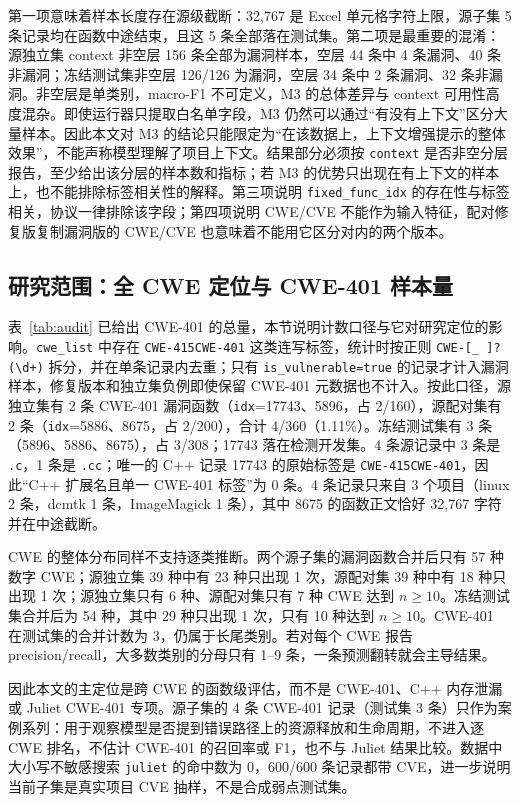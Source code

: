 \documentclass[conference]{IEEEtran}
\begin{document}
第一项意味着样本长度存在源级截断：32{,}767 是 Excel 单元格字符上限，源子集 5 条记录均在函数中途结束，且这 5 条全部落在测试集。第二项是最重要的混淆：源独立集 context 非空层 156 条全部为漏洞样本，空层 44 条中 4 条漏洞、40 条非漏洞；冻结测试集非空层 126/126 为漏洞，空层 34 条中 2 条漏洞、32 条非漏洞。非空层是单类别，macro-F1 不可定义，M3 的总体差异与 context 可用性高度混杂。即使运行器只提取白名单字段，M3 仍然可以通过“有没有上下文”区分大量样本。因此本文对 M3 的结论只能限定为“在该数据上，上下文增强提示的整体效果”，不能声称模型理解了项目上下文。结果部分必须按 \texttt{context} 是否非空分层报告，至少给出该分层的样本数和指标；若 M3 的优势只出现在有上下文的样本上，也不能排除标签相关性的解释。第三项说明 \texttt{fixed\_func\_idx} 的存在性与标签相关，协议一律排除该字段；第四项说明 CWE/CVE 不能作为输入特征，配对修复版复制漏洞版的 CWE/CVE 也意味着不能用它区分对内的两个版本。

\subsection{研究范围：全 CWE 定位与 CWE-401 样本量}
\label{sec:scope-cwe}
表~\ref{tab:audit} 已给出 CWE-401 的总量，本节说明计数口径与它对研究定位的影响。\texttt{cwe\_list} 中存在 \texttt{CWE-415CWE-401} 这类连写标签，统计时按正则 \texttt{CWE-[\_ ]?(\textbackslash d+)} 拆分，并在单条记录内去重；只有 \texttt{is\_vulnerable=true} 的记录才计入漏洞样本，修复版本和独立集负例即使保留 CWE-401 元数据也不计入。按此口径，源独立集有 2 条 CWE-401 漏洞函数（\texttt{idx}=17743、5896，占 2/160），源配对集有 2 条（\texttt{idx}=5886、8675，占 2/200），合计 4/360（1.11\%）。冻结测试集有 3 条（5896、5886、8675），占 3/308；17743 落在检测开发集。4 条源记录中 3 条是 \texttt{.c}，1 条是 \texttt{.cc}；唯一的 C++ 记录 17743 的原始标签是 \texttt{CWE-415CWE-401}，因此“C++ 扩展名且单一 CWE-401 标签”为 0 条。4 条记录只来自 3 个项目（linux 2 条，dcmtk 1 条，ImageMagick 1 条），其中 8675 的函数正文恰好 32{,}767 字符并在中途截断。

CWE 的整体分布同样不支持逐类推断。两个源子集的漏洞函数合并后只有 57 种数字 CWE；源独立集 39 种中有 23 种只出现 1 次，源配对集 39 种中有 18 种只出现 1 次；源独立集只有 6 种、源配对集只有 7 种 CWE 达到 $n\ge 10$。冻结测试集合并后为 54 种，其中 29 种只出现 1 次，只有 10 种达到 $n\ge 10$。CWE-401 在测试集的合并计数为 3，仍属于长尾类别。若对每个 CWE 报告 precision/recall，大多数类别的分母只有 1--9 条，一条预测翻转就会主导结果。

因此本文的主定位是跨 CWE 的函数级评估，而不是 CWE-401、C++ 内存泄漏或 Juliet CWE-401 专项。源子集的 4 条 CWE-401 记录（测试集 3 条）只作为案例系列：用于观察模型是否提到错误路径上的资源释放和生命周期，不进入逐 CWE 排名，不估计 CWE-401 的召回率或 F1，也不与 Juliet 结果比较。数据中大小写不敏感搜索 \texttt{juliet} 的命中数为 0，600/600 条记录都带 CVE，进一步说明当前子集是真实项目 CVE 抽样，不是合成弱点测试集。
\end{document}
